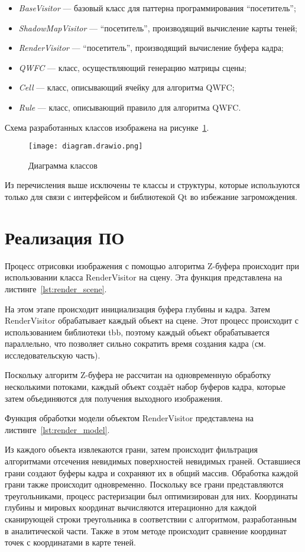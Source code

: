 \begin{itemize}
  \item \emph{BaseVisitor} --- базовый класс для паттерна программирования ``посетитель'';
  \item \emph{ShadowMapVisitor} --- ``посетитель'', производящий вычисление карты теней;
  \item \emph{RenderVisitor} --- ``посетитель'', производящий вычисление буфера кадра;
  \item \emph{QWFC} --- класс, осуществляющий генерацию матрицы сцены;
  \item \emph{Cell} --- класс, описывающий ячейку для алгоритма QWFC;
  \item \emph{Rule} --- класс, описывающий правило для алгоритма QWFC.
\end{itemize}

Схема разработанных классов изображена на рисунке~\ref{fig:UML}.

\begin{figure}[h]
  \texttt{[image: diagram.drawio.png]}
  \caption{Диаграмма классов}
  \label{fig:UML}
\end{figure}

Из перечисления выше исключены те классы и структуры, которые используются только для связи с интерфейсом и библиотекой Qt во избежание загромождения.

\section{Реализация ПО}

Процесс отрисовки изображения с помощью алгоритма Z-буфера происходит при использовании класса RenderVisitor на сцену. 
Эта функция представлена на листинге~\ref{lst:render_scene}. 

На этом этапе происходит инициализация буфера глубины и кадра. Затем RenderVisitor обрабатывает каждый объект на сцене. Этот процесс происходит с использованием библиотеки tbb, поэтому каждый объект обрабатывается параллельно, что позволяет сильно сократить время создания кадра (см. исследовательскую часть).

Поскольку алгоритм Z-буфера не рассчитан на одновременную обработку несколькими потоками, каждый объект создаёт набор буферов кадра, которые затем объединяются для получения выходного изображения.

Функция обработки модели объектом RenderVisitor представлена на листинге~\ref{lst:render_model}.

Из каждого объекта извлекаются грани, затем происходит фильтрация алгоритмами отсечения невидимых поверхностей невидимых граней. Оставшиеся грани создают буферы кадра и сохраняют их в общий массив. Обработка каждой грани также происходит одновременно. Поскольку все грани представляются треугольниками, процесс растеризации был оптимизирован для них. 
Координаты глубины и мировых координат вычисляются итерационно для каждой сканирующей строки треугольника в соответствии с алгоритмом, разработанным в аналитической части.
Также в этом методе происходит сравнение координат точек с координатами в карте теней.

